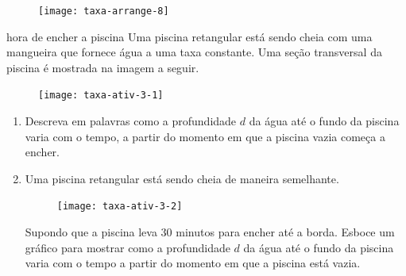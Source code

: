 \begin{figure}[H]
\centering
\texttt{[image: taxa-arrange-8]}
\end{figure}

\practice{}

\begin{task}{hora de encher a piscina}
Uma piscina retangular está sendo cheia com uma mangueira que fornece água a uma taxa constante. Uma seção transversal da piscina é mostrada na imagem a seguir.

\begin{figure}[H]
\centering
\texttt{[image: taxa-ativ-3-1]}
\end{figure}

\begin{enumerate}
\item Descreva em palavras como a profundidade $d$ da água até o fundo da piscina varia com o tempo, a partir do momento em que a piscina vazia começa a encher.
\item Uma piscina retangular está sendo cheia de maneira semelhante.

\begin{figure}[H]
\centering
\texttt{[image: taxa-ativ-3-2]}

\end{figure}

Supondo que a piscina leva 30 minutos para encher até a borda. Esboce um gráfico para mostrar como a profundidade $d$ da água até o fundo da piscina varia com o tempo a partir do momento em que a piscina está vazia.

\begin{figure}[H]
\centering

\end{figure}
\end{enumerate}
\end{task}

